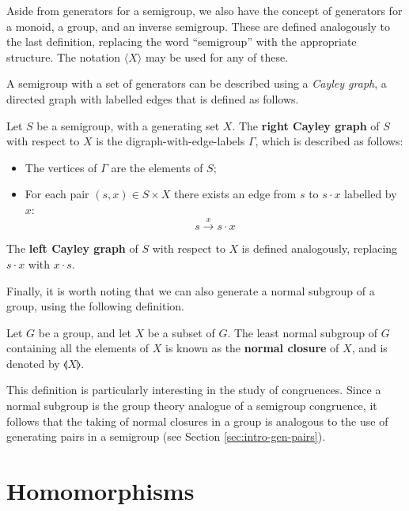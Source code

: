 Aside from generators for a semigroup, we also have the concept of generators
for a monoid, a group, and an inverse semigroup.  These are defined analogously
to the last definition, replacing the word ``semigroup'' with the appropriate
structure.  The notation $\langle X \rangle$ may be used for any of these.

A semigroup with a set of generators can be described using a \textit{Cayley
  graph}, a directed graph with labelled edges that is defined as follows.

\begin{definition}
  \label{def:cayley-graph}
  Let $S$ be a semigroup, with a generating set $X$.  The \textbf{right Cayley
    graph} of $S$ with respect to $X$ is the digraph-with-edge-labels $\Gamma$,
  which is described as follows:
  \begin{itemize}
  \item The vertices of $\Gamma$ are the elements of $S$;
  \item For each pair $(s, x) \in S \times X$ there exists an edge from $s$ to
    $s \cdot x$ labelled by $x$:
    $$s \overset{x}{\longrightarrow} s \cdot x$$
  \end{itemize}
  The \textbf{left Cayley graph} of $S$ with respect to $X$ is defined
  analogously, replacing $s \cdot x$ with $x \cdot s$.
\end{definition}

Finally, it is worth noting that we can also generate a normal subgroup of a
group, using the following definition.

\begin{definition}
  \label{def:normal-closure}
  Let $G$ be a group, and let $X$ be a subset of $G$.  The least normal subgroup
  of $G$ containing all the elements of $X$ is known as the \textbf{normal
    closure} of $X$, and is denoted by $\llangle X \rrangle$.
\end{definition}

This definition is particularly interesting in the study of congruences.  Since
a normal subgroup is the group theory analogue of a semigroup congruence, it
follows that the taking of normal closures in a group is analogous to the use of
generating pairs in a semigroup (see Section \ref{sec:intro-gen-pairs}).

\section{Homomorphisms}
\label{sec:homomorphisms}

